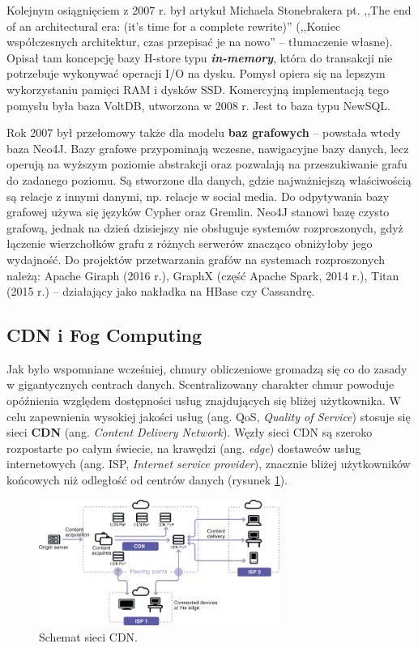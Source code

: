 \documentclass[12pt,a4paper,twoside,titlepage,openright]{book}
\begin{document}
Kolejnym osiągnięciem z 2007 r. był artykuł Michaela Stonebrakera pt. ,,The end of an architectural era: (it's time for a complete rewrite)'' (,,Koniec współczesnych architektur, czas przepisać je na nowo'' -- tłumaczenie własne). Opisał tam koncepcję bazy H-store typu \textit{\textbf{in-memory}}, która do transakcji nie potrzebuje wykonywać operacji I/O na dysku. Pomysł opiera się na lepszym wykorzystaniu pamięci RAM i dysków SSD. Komercyjną implementacją tego pomysłu była baza VoltDB, utworzona w 2008 r. Jest to baza typu NewSQL.

Rok 2007 był przełomowy także dla modelu \textbf{baz grafowych} -- powstała wtedy baza Neo4J. Bazy grafowe przypominają wczesne, nawigacyjne bazy danych, lecz operują na wyższym poziomie abstrakcji oraz pozwalają na przeszukiwanie grafu do zadanego poziomu. Są stworzone dla danych, gdzie najważniejszą właściwością są relacje z innymi danymi, np. relacje w social media. Do odpytywania bazy grafowej używa się języków Cypher oraz Gremlin. Neo4J stanowi bazę czysto grafową, jednak na dzień dzisiejszy nie obsługuje systemów rozproszonych, gdyż łączenie wierzchołków grafu z różnych serwerów znacząco obniżyłoby jego wydajność. Do projektów przetwarzania grafów na systemach rozproszonych należą: Apache Giraph (2016 r.), GraphX (część Apache Spark, 2014 r.), Titan (2015 r.) -- działający jako nakładka na HBase czy Cassandrę.


\subsection{CDN i Fog Computing} \label{section:fog}

Jak było wspomniane wcześniej, chmury obliczeniowe gromadzą się co do zasady w gigantycznych centrach danych. Scentralizowany charakter chmur powoduje opóźnienia względem dostępności usług znajdujących się bliżej użytkownika. W celu zapewnienia wysokiej jakości usług (ang. QoS, \textit{Quality of Service}) stosuje się sieci \textbf{CDN} (ang. \textit{Content Delivery Network}). Węzły sieci CDN są szeroko rozpostarte po całym świecie, na krawędzi (ang. \textit{edge}) dostawców usług internetowych (ang. ISP, \textit{Internet service provider}), znacznie bliżej użytkowników końcowych niż odległość od centrów danych (rysunek \ref{fig:cdn-schemat}). \cite{cdn}

\begin{figure}[h]
	\centering
			\includegraphics[width=0.7\textwidth]{cdn-schemat.jpg}
		\caption{Schemat sieci CDN. \cite{cdn}}
		\label{fig:cdn-schemat}
\end{figure}
\end{document}
